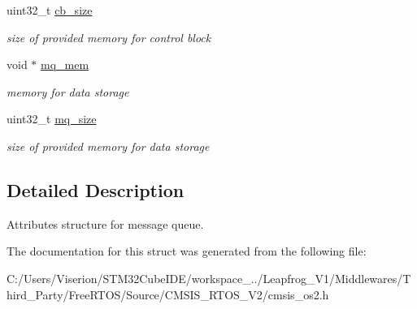 \begin{DoxyCompactItemize}
uint32\+\_\+t \mbox{\hyperlink{structos_message_queue_attr__t_af027a158b586c5064006bba6f965b8fa}{cb\+\_\+size}}
\begin{DoxyCompactList}\small\item\em size of provided memory for control block \end{DoxyCompactList}\item 
\mbox{\label{structos_message_queue_attr__t_af1492738958bf4a44c90d96a08d34a57}} 
void $\ast$ \mbox{\hyperlink{structos_message_queue_attr__t_af1492738958bf4a44c90d96a08d34a57}{mq\+\_\+mem}}
\begin{DoxyCompactList}\small\item\em memory for data storage \end{DoxyCompactList}\item 
\mbox{\label{structos_message_queue_attr__t_adec49e7e57147aed14e83bd99cf2c6d7}} 
uint32\+\_\+t \mbox{\hyperlink{structos_message_queue_attr__t_adec49e7e57147aed14e83bd99cf2c6d7}{mq\+\_\+size}}
\begin{DoxyCompactList}\small\item\em size of provided memory for data storage \end{DoxyCompactList}\end{DoxyCompactItemize}


\subsection{Detailed Description}
Attributes structure for message queue. 

The documentation for this struct was generated from the following file\+:\begin{DoxyCompactItemize}
\item 
C\+:/\+Users/\+Viserion/\+S\+T\+M32\+Cube\+I\+D\+E/workspace\+\_../\+Leapfrog\+\_\+\+V1/\+Middlewares/\+Third\+\_\+\+Party/\+Free\+R\+T\+O\+S/\+Source/\+C\+M\+S\+I\+S\+\_\+\+R\+T\+O\+S\+\_\+\+V2/cmsis\+\_\+os2.\+h\end{DoxyCompactItemize}
